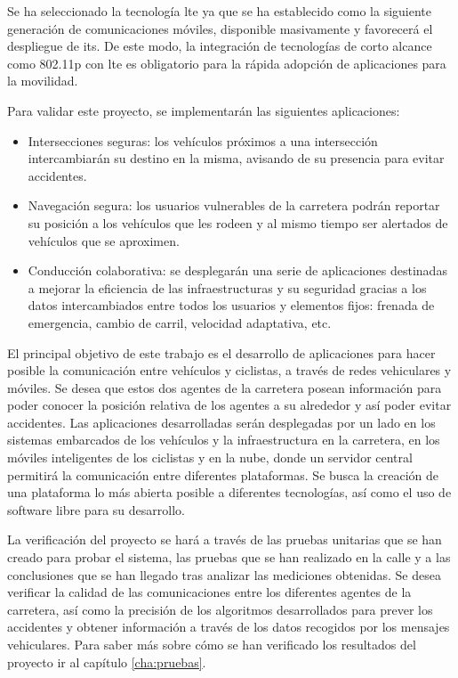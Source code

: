 Se ha seleccionado la tecnología \gls{lte} ya que se ha establecido como la
siguiente generación de comunicaciones móviles, disponible masivamente y
favorecerá el despliegue de \gls{its}. De este modo, la integración de
tecnologías de corto alcance como \Gls{802.11p} con \gls{lte} es obligatorio
para la rápida adopción de aplicaciones para la movilidad.

Para validar este proyecto, se implementarán las siguientes aplicaciones:
\begin{itemize}
	\item Intersecciones seguras: los vehículos próximos a una intersección
	intercambiarán su destino en la misma, avisando de su presencia para evitar
	accidentes.

	\item Navegación segura: los usuarios vulnerables de la carretera podrán
	reportar su posición a los vehículos que les rodeen y al mismo tiempo ser
	alertados de vehículos que se aproximen.

	\item Conducción colaborativa: se desplegarán una serie de aplicaciones
	destinadas a mejorar la eficiencia de las infraestructuras y su seguridad
	gracias a los datos intercambiados entre todos los usuarios y elementos fijos:
	frenada de emergencia, cambio de carril, velocidad adaptativa, etc.
\end{itemize}

El principal objetivo de este trabajo es el desarrollo de aplicaciones para
hacer posible la comunicación entre vehículos y ciclistas, a través de redes
vehiculares y móviles. Se desea que estos dos agentes de la carretera posean
información para poder conocer la posición relativa de los agentes a su
alrededor y así poder evitar accidentes. Las aplicaciones desarrolladas serán
desplegadas por un lado en los sistemas embarcados de los vehículos y la
infraestructura en la carretera, en los móviles inteligentes de los ciclistas y
en la nube, donde un servidor central permitirá la comunicación entre diferentes
plataformas. Se busca la creación de una plataforma lo más abierta posible a
diferentes tecnologías, así como el uso de software libre para su desarrollo.

La verificación del proyecto se hará a través de las pruebas unitarias que se
han creado para probar el sistema, las pruebas que se han realizado en la calle
y a las conclusiones que se han llegado tras analizar las mediciones obtenidas.
Se desea verificar la calidad de las comunicaciones entre los diferentes agentes
de la carretera, así como la precisión de los algoritmos desarrollados para
prever los accidentes y obtener información a través de los datos recogidos por
los mensajes vehiculares. Para saber más sobre cómo se han verificado los
resultados del proyecto ir al capítulo \ref{cha:pruebas}.

